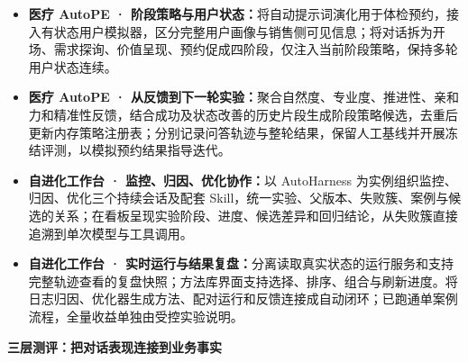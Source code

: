 \documentclass[10pt,a4paper,UTF8,fontset=fandol]{ctexart}
\begin{document}
\begin{itemize}
\item \textbf{医疗 AutoPE · 阶段策略与用户状态：}将自动提示词演化用于体检预约，接入有状态用户模拟器，区分完整用户画像与销售侧可见信息；将对话拆为开场、需求探询、价值呈现、预约促成四阶段，仅注入当前阶段策略，保持多轮用户状态连续。
\item \textbf{医疗 AutoPE · 从反馈到下一轮实验：}聚合自然度、专业度、推进性、亲和力和精准性反馈，结合成功及状态改善的历史片段生成阶段策略候选，去重后更新内存策略注册表；分别记录问答轨迹与整轮结果，保留人工基线并开展冻结评测，以模拟预约结果指导迭代。
\item \textbf{自进化工作台 · 监控、归因、优化协作：}以 AutoHarness 为实例组织监控、归因、优化三个持续会话及配套 Skill，统一实验、父版本、失败簇、案例与候选的关系；在看板呈现实验阶段、进度、候选差异和回归结论，从失败簇直接追溯到单次模型与工具调用。
\item \textbf{自进化工作台 · 实时运行与结果复盘：}分离读取真实状态的运行服务和支持完整轨迹查看的复盘快照；方法库界面支持选择、排序、组合与刷新进度。将日志归因、优化器生成方法、配对运行和反馈连接成自动闭环；已跑通单案例流程，全量收益单独由受控实验说明。
\end{itemize}
\begin{center}
{\small\bfseries 三层测评：把对话表现连接到业务事实}\par\vspace{4pt}
\par\vspace{2pt}{\footnotesize 图 2｜三层分别依据调用轨迹、完整会话、业务终态评分；“回复说完成”不能替代数据库中的实际完成。}
\end{center}
\end{document}
